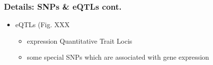 \begin{frame}
	\frametitle{Details: SNPs \& eQTLs cont.}
	\begin{itemize}
		\item eQTLs  (Fig. XXX
		\begin{itemize}
		\item  expression Quantitative Trait Locis
		\item some special SNPs which are associated with gene expression 
		\end{itemize}
	\end{itemize}
\end{frame}
%   
%
%    
%
%    
%         
%         
%

